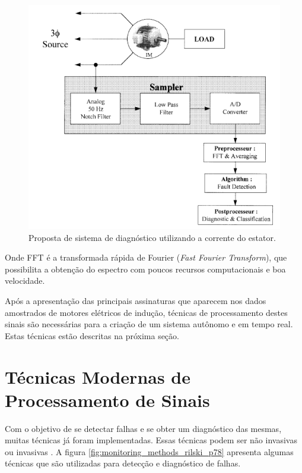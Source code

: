\begin{figure}[H]
    \caption{Proposta de sistema de diagnóstico utilizando a corrente do estator.}
    \begin{center}
        \includegraphics[scale=.5]{referencial/img/current_benbouzid_p3.png}
    \end{center}
    \label{fig:current_benbouzid_p3}
\end{figure}

Onde FFT é a transformada rápida de Fourier (\textit{Fast Fourier Transform}), que possibilita a obtenção do espectro com poucos recursos
computacionais e boa velocidade.

Após a apresentação das principais assinaturas que aparecem nos dados amostrados de motores elétricos de indução, técnicas de processamento
destes sinais são necessárias para a criação de um sistema autônomo e em tempo real. Estas técnicas estão descritas na próxima seção.


% 

\section{Técnicas Modernas de Processamento de Sinais}\label{sec:}

Com o objetivo de se detectar falhas e se obter um diagnóstico das mesmas, muitas técnicas já foram implementadas. Essas técnicas podem ser
não invasivas ou invasivas \cite{Gorbounov2018}. A figura \ref{fig:monitoring_methods_rilski_p78} apresenta algumas técnicas que são
utilizadas para detecção e diagnóstico de falhas.

